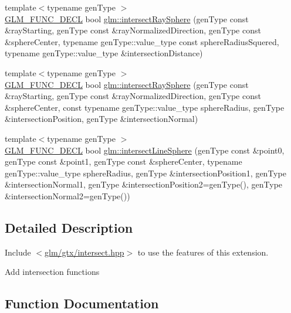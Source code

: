 \begin{DoxyCompactItemize}
\item 
{\footnotesize template$<$typename gen\+Type $>$ }\\\hyperlink{setup_8hpp_ab2d052de21a70539923e9bcbf6e83a51}{G\+L\+M\+\_\+\+F\+U\+N\+C\+\_\+\+D\+E\+CL} bool \hyperlink{group__gtx__intersect_gac88f8cd84c4bcb5b947d56acbbcfa56e}{glm\+::intersect\+Ray\+Sphere} (gen\+Type const \&ray\+Starting, gen\+Type const \&ray\+Normalized\+Direction, gen\+Type const \&sphere\+Center, typename gen\+Type\+::value\+\_\+type const sphere\+Radius\+Squered, typename gen\+Type\+::value\+\_\+type \&intersection\+Distance)
\item 
{\footnotesize template$<$typename gen\+Type $>$ }\\\hyperlink{setup_8hpp_ab2d052de21a70539923e9bcbf6e83a51}{G\+L\+M\+\_\+\+F\+U\+N\+C\+\_\+\+D\+E\+CL} bool \hyperlink{group__gtx__intersect_gad28c00515b823b579c608aafa1100c1d}{glm\+::intersect\+Ray\+Sphere} (gen\+Type const \&ray\+Starting, gen\+Type const \&ray\+Normalized\+Direction, gen\+Type const \&sphere\+Center, const typename gen\+Type\+::value\+\_\+type sphere\+Radius, gen\+Type \&intersection\+Position, gen\+Type \&intersection\+Normal)
\item 
{\footnotesize template$<$typename gen\+Type $>$ }\\\hyperlink{setup_8hpp_ab2d052de21a70539923e9bcbf6e83a51}{G\+L\+M\+\_\+\+F\+U\+N\+C\+\_\+\+D\+E\+CL} bool \hyperlink{group__gtx__intersect_ga9c68139f3d8a4f3d7fe45f9dbc0de5b7}{glm\+::intersect\+Line\+Sphere} (gen\+Type const \&point0, gen\+Type const \&point1, gen\+Type const \&sphere\+Center, typename gen\+Type\+::value\+\_\+type sphere\+Radius, gen\+Type \&intersection\+Position1, gen\+Type \&intersection\+Normal1, gen\+Type \&intersection\+Position2=gen\+Type(), gen\+Type \&intersection\+Normal2=gen\+Type())
\end{DoxyCompactItemize}


\subsection{Detailed Description}
Include $<$\hyperlink{intersect_8hpp}{glm/gtx/intersect.\+hpp}$>$ to use the features of this extension.

Add intersection functions 

\subsection{Function Documentation}
\mbox{\label{group__gtx__intersect_ga9c68139f3d8a4f3d7fe45f9dbc0de5b7}} 
